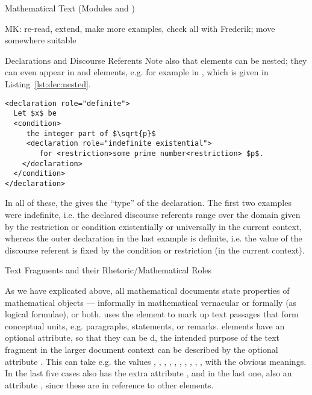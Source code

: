 \begin{tchapter}[id=mtxt,short=Mathematical Text]{Mathematical Text (Modules
   and )}
\begin{newpart}{MK: re-read, extend, make more examples, check all with Frederik; move
    somewhere suitable}
\begin{tsection}[id=declarations]{Declarations and Discourse Referents}
Note also that  elements can be nested; they can even appear in
 and  elements, e.g. for example in , which is given in
Listing~\ref{lst:dec:nested}. 

\begin{lstlisting}[caption=Nested Declarations,label=lst:dec:nested,mathescape]
<declaration role="definite">
  Let $x$ be 
  <condition>
     the integer part of $\sqrt{p}$
     <declaration role="indefinite existential"> 
        for <restriction>some prime number<restriction> $p$. 
    </declaration>
  </condition>  
</declaration>
\end{lstlisting}
In all of these, the  gives the ``type'' of the
declaration. The first two examples were indefinite, i.e. the declared discourse referents
range over the domain given by the restriction or condition existentially or universally
in the current context, whereas the outer declaration in the last example is definite,
i.e. the value of the discourse referent is fixed by the condition or restriction (in the
current context).
\end{tsection}
\end{newpart}
\begin{tsection}[id=omtext]{Text Fragments and their Rhetoric/Mathematical Roles}

  As we have explicated above, all mathematical documents state properties of mathematical
  objects --- informally in mathematical vernacular or formally (as logical formulae), or
  both. \omdoc uses the  element to mark up text passages that form
  conceptual units, e.g. paragraphs, statements, or remarks.   elements
  have an optional  attribute, so that they can be
  {d}, the intended purpose of the text fragment in the larger
  document context can be described by the optional attribute .
  This can take e.g. the values ,
  , ,
  , ,
  , ,
  , ,
  ,  with the obvious
  meanings. In the last five cases  also has the extra attribute
  , and in the last one, also an attribute
  , since these are in reference to other \omdoc elements.


\end{tsection}
\end{tchapter}
